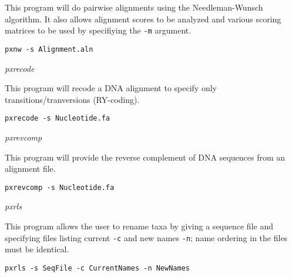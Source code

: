 \documentclass[12pt,letterpaper]{article}
\renewcommand{\subsection}[1]{%
\bigskip
\begin{center}
\begin{large}
\normalfont\itshape #1
\end{large}
\end{center}}
\begin{document}
This program will do pairwise alignments using the Needleman-Wunsch algorithm. It also allows alignment scores to be analyzed and various scoring matrices to be used by specifiying the \texttt{-m} argument.

\begin{flushleft}
\begin{verbatim}
pxnw -s Alignment.aln
\end{verbatim}
\end{flushleft}

\subsection{pxrecode}

This program will recode a DNA alignment to specify only transitions/tranversions (RY-coding).

\begin{flushleft}
\begin{verbatim}
pxrecode -s Nucleotide.fa
\end{verbatim}
\end{flushleft}

\subsection{pxrevcomp}

This program will provide the reverse complement of DNA sequences from an alignment file.

\begin{flushleft}
\begin{verbatim}
pxrevcomp -s Nucleotide.fa
\end{verbatim}
\end{flushleft}

\subsection{pxrls}

This program allows the user to rename taxa by giving a sequence file and specifying files listing current \texttt{-c} and new names \texttt{-n}; name ordering in the files must be identical.

\begin{flushleft}
\begin{verbatim}
pxrls -s SeqFile -c CurrentNames -n NewNames
\end{verbatim}
\end{flushleft}
\end{document}
